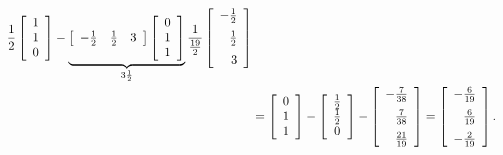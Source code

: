 \begin{align*}
		\frac{1}{2}
		   \left[ \begin{array}{c} 1 \\ 1 \\ 0 \end{array} \right]
		- \underbrace{%
		   \left[ \begin{array}{ccc}
			-\frac{1}{2} & \frac{1}{2} & 3 \end{array} \right]
		   \left[ \begin{array}{c} 0 \\ 1 \\ 1 \end{array} \right]%
		   }_{3\frac{1}{2}}
		\frac{1}{\frac{19}{2}}
		   \left[ \begin{array}{r}
			-\frac{1}{2} \medskip \\ \frac{1}{2} \medskip \\ 3 \end{array} \right] \\
		&= \left[ \begin{array}{c} 0 \\ 1 \\ 1 \end{array} \right]
		- \left[ \begin{array}{c}
			\frac{1}{2} \\ \frac{1}{2} \\ 0 \end{array} \right]
		- \left[ \begin{array}{r}
			-\frac{7}{38} \medskip \\ \frac{7}{38} \medskip \\ \frac{21}{19}
			\end{array} \right]
		= \left[ \begin{array}{r}
			-\frac{6}{19} \medskip \\ \frac{6}{19} \medskip \\ -\frac{2}{19}
			\end{array} \right].
	\end{align*}

